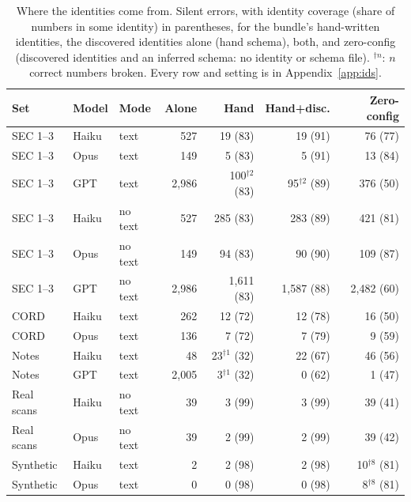 \begin{table}[t]
\centering\tsize\setlength{\tabcolsep}{2.6pt}
\caption{Where the identities come from. Silent errors, with identity coverage (share of numbers in some identity) in parentheses, for the bundle's hand-written identities, the discovered identities alone (hand schema), both, and zero-config (discovered identities and an inferred schema: no identity or schema file). $^{\dagger n}$: $n$ correct numbers broken. Every row and setting is in Appendix~\ref{app:ids}.}
\label{tab:ids}
\begin{tabular*}{\columnwidth}{@{\extracolsep{\fill}}lllrrrr@{}}
\toprule
Set & Model & Mode & Alone & Hand & Hand+disc. & Zero-config \\
\midrule
SEC 1--3 & Haiku & text & 527 & 19 (83) & 19 (91) & 76 (77) \\
SEC 1--3 & Opus & text & 149 & 5 (83) & 5 (91) & 13 (84) \\
SEC 1--3 & GPT & text & 2,986 & 100$^{\dagger2}$ (83) & 95$^{\dagger2}$ (89) & 376 (50) \\
SEC 1--3 & Haiku & no text & 527 & 285 (83) & 283 (89) & 421 (81) \\
SEC 1--3 & Opus & no text & 149 & 94 (83) & 90 (90) & 109 (87) \\
SEC 1--3 & GPT & no text & 2,986 & 1,611 (83) & 1,587 (88) & 2,482 (60) \\
\midrule
CORD & Haiku & text & 262 & 12 (72) & 12 (78) & 16 (50) \\
CORD & Opus & text & 136 & 7 (72) & 7 (79) & 9 (59) \\
\midrule
Notes & Haiku & text & 48 & 23$^{\dagger1}$ (32) & 22 (67) & 46 (56) \\
Notes & GPT & text & 2,005 & 3$^{\dagger1}$ (32) & 0 (62) & 1 (47) \\
\midrule
Real scans & Haiku & no text & 39 & 3 (99) & 3 (99) & 39 (41) \\
Real scans & Opus & no text & 39 & 2 (99) & 2 (99) & 39 (42) \\
\midrule
Synthetic & Haiku & text & 2 & 2 (98) & 2 (98) & 10$^{\dagger8}$ (81) \\
Synthetic & Opus & text & 0 & 0 (98) & 0 (98) & 8$^{\dagger8}$ (81) \\
\bottomrule
\end{tabular*}
\end{table}
